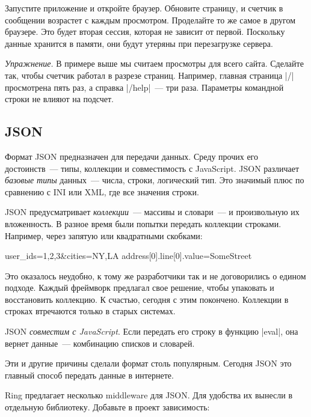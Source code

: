Запустите приложение и откройте браузер. Обновите страницу, и счетчик в
сообщении возрастет с каждым просмотром. Проделайте то же самое в другом
браузере. Это будет вторая сессия, которая не зависит от первой. Поскольку
данные хранится в памяти, они будут утеряны при перезагрузке сервера.

\emph{Упражнение.} В примере выше мы считаем просмотры для всего сайта. Сделайте
так, чтобы счетчик работал в разрезе страниц. Например, главная страница
\spverb|/| просмотрена пять раз, а справка \spverb|/help|~--- три
раза. Параметры командной строки не влияют на подсчет.

\subsection{JSON}

Формат JSON предназначен для передачи данных. Среду прочих его достоинств~---
типы, коллекции и совместимость с JavaScript. JSON различает \emph{базовые типы}
данных~--- числа, строки, логический тип. Это значимый плюс по сравнению с INI
или XML, где все значения строки.

JSON предусматривает \emph{коллекции}~--- массивы и словари~--- и произвольную их
вложенность. В разное время были попытки передать коллекции строками. Например,
через запятую или квадратными скобками:

\begin{english}
  \begin{text}
user_ids=1,2,3&cities=NY,LA
address[0].line[0].value=SomeStreet
  \end{text}
\end{english}

\noindent
Это оказалось неудобно, к тому же разработчики так и не договорились о едином
подходе. Каждый фреймворк предлагал свое решение, чтобы упаковать и восстановить
коллекцию. К счастью, сегодня с этим покончено. Коллекции в строках втречаются
только в старых системах.

JSON \emph{совместим с JavaScript}. Если передать его строку в функцию
\spverb|eval|, она вернет данные~--- комбинацию списков и словарей.

Эти и другие причины сделали формат столь популярным. Сегодня JSON это главный
способ передать данные в интернете.

Ring предлагает несколько middleware для JSON. Для удобства их вынесли
в отдельную библиотеку. Добавьте в проект зависимость:

\begin{english}
  \begin{clojure}
  \end{clojure}
\end{english}

